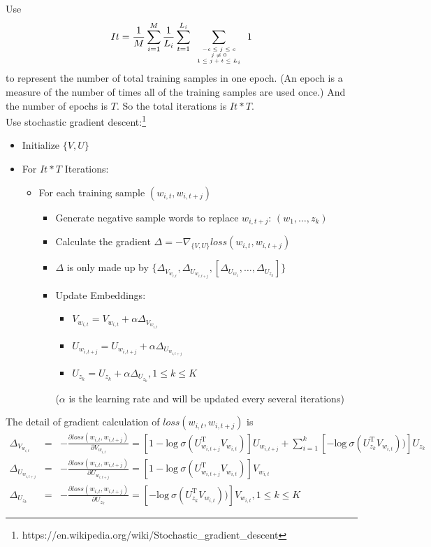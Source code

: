 Use 
$$It = \frac{1}{M}\sum_{i=1}^M\frac{1}{L_i}\sum_{t=1}^{L_i}\sum\limits_{\mbox{\tiny$\begin{array}{c}-c\leq j \leq c\\ j\neq 0\\ 1\leq j+t\leq L_i\end{array}$}} 1$$
to represent the number of total training samples in one epoch. (An epoch is a measure of the number of times all of the training samples are used once.) And the number of epochs is $T$. So the total iterations is $It*T$.\\
	
Use stochastic gradient descent:\footnote{https://en.wikipedia.org/wiki/Stochastic\_gradient\_descent} 
	\begin{itemize}
	\item Initialize $\{V,U\}$
	\item For $It*T$ Iterations: 
		\begin{itemize}
		\item For each training sample $(w_{i,t},w_{i,{t+j}})$
		\begin{itemize}
		\item Generate negative sample words to replace $w_{i,t+j}$: $(w_1,\ldots,z_k)$
		\item Calculate the gradient $\Delta = -\nabla_{\{V,U\}} loss(w_{i,t},w_{i,{t+j}})$
		\item $\Delta$ is only made up by $\{\Delta_{V_{w_{i,t}}}, \Delta_{U_{w_{i,t+j}}}, [\Delta_{U_{w_1}},\ldots,\Delta_{U_{z_k}}]\}$
		\item Update Embeddings: 
		\begin{itemize}
		\item $V_{w_{i,t}} = V_{w_{i,t}}+\alpha\Delta_{V_{w_{i,t}}}$
		\item $U_{w_{i,t+j}} = U_{w_{i,t+j}}+\alpha\Delta_{U_{w_{i,t+j}}}$
		\item $U_{z_k} = U_{z_k}+\alpha\Delta_{U_{z_k}}, 1\leq k\leq K$ 
		\end{itemize}
		($\alpha$ is the learning rate and will be updated every several iterations)
		\end{itemize}
		\end{itemize}
	\end{itemize}
The detail of gradient calculation of $loss(w_{i,t},w_{i,t+j})$ is
\begin{eqnarray*}
	\Delta_{V_{w_{i,t}}} &=& -\frac{\partial loss(w_{i,t},w_{i,t+j})}{\partial V_{w_{i,t}}} = [1-\mathrm{log}\ \sigma(U_{w_{i,t+j}}^{\mathrm{T}}V_{w_{i,t}})]U_{w_{i,t+j}}+\sum_{i=1}^k [-\mathrm{log}\ \sigma(U_{z_k}^{\mathrm{T}}V_{w_{i,t}}))]U_{z_k}\\
	\Delta_{U_{w_{i,t+j}}} &=& -\frac{\partial loss(w_{i,t},w_{i,t+j})}{\partial U_{w_{i,t+j}}} = [1-\mathrm{log}\ \sigma(U_{w_{i,t+j}}^{\mathrm{T}}V_{w_{i,t}})]V_{w_{i,t}}\\
	\Delta_{U_{z_k}} &=& -\frac{\partial loss(w_{i,t},w_{i,t+j})}{\partial U_{z_k}} = [-\mathrm{log}\ \sigma(U_{z_k}^{\mathrm{T}}V_{w_{i,t}}))]V_{w_{i,t}}, 1\leq k\leq K
\end{eqnarray*}
